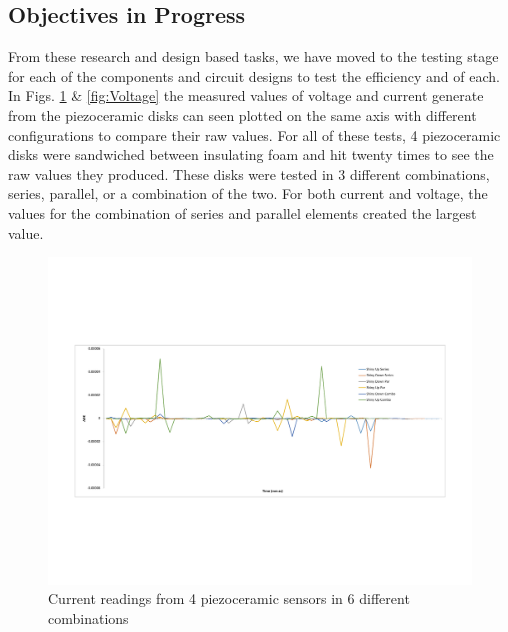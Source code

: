 \documentclass[letterpaper, 12 pt, onecolumn, hidelinks]{ieeetran}
\begin{document}
\subsection{Objectives in Progress}\label{sec:inProgress}
From these research and design based tasks, we have moved to the testing stage for each of the components and circuit designs to test the efficiency and of each. In Figs. \ref{fig:Current} \& \ref{fig:Voltage} the measured values of voltage and current generate from the piezoceramic disks can seen plotted on the same axis with different configurations to compare their raw values. For all of these tests, 4 piezoceramic disks were sandwiched between insulating foam and hit twenty times to see the raw values they produced. These disks were tested in 3 different combinations, series, parallel, or a combination of the two. For both current and voltage, the values for the combination of series and parallel elements created the largest value. 

\begin{figure}[h]
	\begin{center}
		\includegraphics[trim=55 210 75 168, clip, width=\columnwidth]{Current.pdf}
	\end{center}
	\vspace{-1em}
	\caption{\label{fig:Current}Current readings from 4 piezoceramic sensors in 6 different combinations}
\end{figure}
\end{document}
